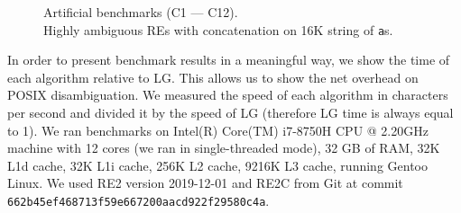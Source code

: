 \documentclass[AMA,STIX1COL]{WileyNJD-v2}
\begin{document}
\begin{figure}

    \caption{
    Artificial benchmarks (C1 --- C12).\\
    Highly ambiguous REs with concatenation on 16K string of \texttt{a}s.
    }\label{fig:bench}
\end{figure}

In order to present benchmark results in a meaningful way, we show the time of each algorithm relative to LG.
This allows us to show the net overhead on POSIX disambiguation.
We measured the speed of each algorithm in characters per second and divided it by the speed of LG
(therefore LG time is always equal to 1).
%
We ran benchmarks on Intel(R) Core(TM) i7-8750H CPU @ 2.20GHz machine
with 12 cores (we ran in single-threaded mode),
32 GB of RAM,
32K L1d cache,
32K L1i cache,
256K L2 cache,
9216K L3 cache,
running Gentoo Linux.
We used RE2 version 2019-12-01
and RE2C from Git \cite{RE2C} at commit \texttt{662b45ef468713f59e667200aacd922f29580c4a}.
\end{document}
